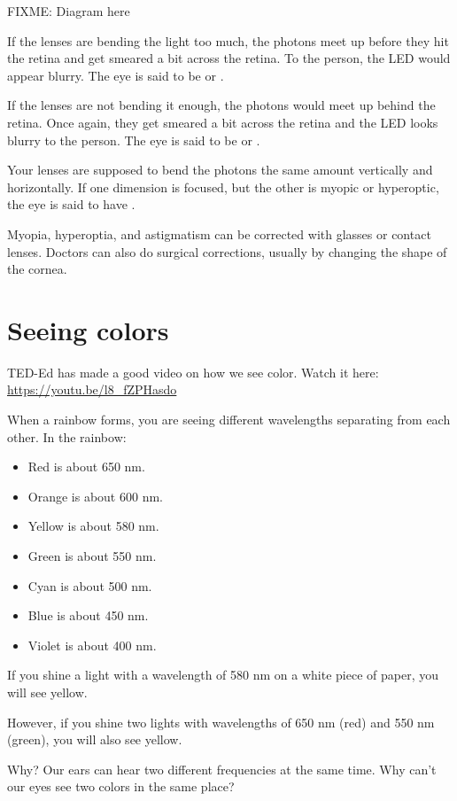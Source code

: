 FIXME: Diagram here

If the lenses are bending the light too much, the photons meet up before they hit the
retina and get smeared a bit across the retina. To the person, the LED
would appear blurry. The eye is said to be  or
.

If the lenses are not bending it enough, the photons would meet up
behind the retina.  Once again, they get smeared a bit across the
retina and the LED looks blurry to the person. The eye is said to be
 or .

Your lenses are supposed to bend the photons the same amount
vertically and horizontally. If one dimension is focused, but the
other is myopic or hyperoptic, the eye is said to have .

Myopia, hyperoptia, and astigmatism can be corrected with glasses or contact
lenses. Doctors can also do surgical corrections, usually by changing
the shape of the cornea.

\section{Seeing colors}

TED-Ed has made a good video on how we see color. Watch it here: \url{https://youtu.be/l8_fZPHasdo}

When a rainbow forms, you are seeing different wavelengths separating from each other. In the rainbow:
\begin{itemize}
\item Red is about 650 nm.
\item Orange is about 600 nm.
\item Yellow is about 580 nm.
\item Green is about 550 nm.
\item Cyan is about 500 nm.
\item Blue is about 450 nm.
\item Violet is about 400 nm.
\end{itemize}

If you shine a light with a wavelength of 580 nm on a white piece of
paper, you will see yellow.

However, if you shine two lights with wavelengths of 650 nm (red) and
550 nm (green), you will also see yellow.

Why? Our ears can hear two different frequencies at the same time.
Why can't our eyes see two colors in the same place?

